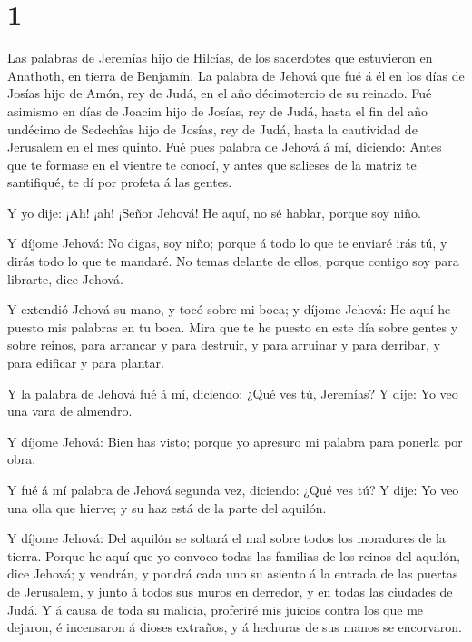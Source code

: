 \hypertarget{section}{%
\section{1}\label{section}}

 Las palabras de Jeremías hijo de Hilcías, de los sacerdotes
que estuvieron en Anathoth, en tierra de Benjamín.  La
palabra de Jehová que fué á él en los días de Josías hijo de Amón, rey
de Judá, en el año décimotercio de su reinado.  Fué asimismo
en días de Joacim hijo de Josías, rey de Judá, hasta el fin del año
undécimo de Sedechîas hijo de Josías, rey de Judá, hasta la cautividad
de Jerusalem en el mes quinto.  Fué pues palabra de Jehová á
mí, diciendo:  Antes que te formase en el vientre te conocí,
y antes que salieses de la matriz te santifiqué, te dí por profeta á las
gentes.

 Y yo dije: ¡Ah! ¡ah! ¡Señor Jehová! He aquí, no sé hablar,
porque soy niño.

 Y díjome Jehová: No digas, soy niño; porque á todo lo que
te enviaré irás tú, y dirás todo lo que te mandaré.  No
temas delante de ellos, porque contigo soy para librarte, dice Jehová.

 Y extendió Jehová su mano, y tocó sobre mi boca; y díjome
Jehová: He aquí he puesto mis palabras en tu boca.  Mira
que te he puesto en este día sobre gentes y sobre reinos, para arrancar
y para destruir, y para arruinar y para derribar, y para edificar y para
plantar.

 Y la palabra de Jehová fué á mí, diciendo: ¿Qué ves tú,
Jeremías? Y dije: Yo veo una vara de almendro.

 Y díjome Jehová: Bien has visto; porque yo apresuro mi
palabra para ponerla por obra.

 Y fué á mí palabra de Jehová segunda vez, diciendo: ¿Qué
ves tú? Y dije: Yo veo una olla que hierve; y su haz está de la parte
del aquilón.

 Y díjome Jehová: Del aquilón se soltará el mal sobre todos
los moradores de la tierra.  Porque he aquí que yo convoco
todas las familias de los reinos del aquilón, dice Jehová; y vendrán, y
pondrá cada uno su asiento á la entrada de las puertas de Jerusalem, y
junto á todos sus muros en derredor, y en todas las ciudades de Judá.
 Y á causa de toda su malicia, proferiré mis juicios contra
los que me dejaron, é incensaron á dioses extraños, y á hechuras de sus
manos se encorvaron.

